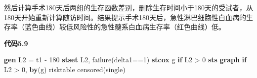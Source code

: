 \documentclass[
  chinese-hans,
  letterpaper,
  DIV=11,
  numbers=noendperiod]{scrreprt}
\newenvironment{Shaded}{\begin{snugshade}}{\end{snugshade}}
\newcommand{\KeywordTok}[1]{\textcolor[rgb]{0.00,0.23,0.31}{\textbf{#1}}}
\newcommand{\NormalTok}[1]{\textcolor[rgb]{0.00,0.23,0.31}{#1}}
\begin{document}
然后计算手术180天后两组的生存函数差别，删除生存时间小于180天的受试者，从180天开始重新计算随访时间。结果提示手术180天后，急性淋巴细胞性白血病的生存率（蓝色曲线）较低风险性的急性髓系白血病生存率（红色曲线）低。

\begin{tcolorbox}[enhanced jigsaw, arc=.35mm, bottomrule=.15mm, breakable, colback=white, colframe=quarto-callout-note-color-frame, left=2mm, leftrule=.75mm, opacityback=0, rightrule=.15mm, toprule=.15mm]

\vspace{-3mm}\textbf{代码5.9}\vspace{3mm}

\begin{Shaded}
\begin{Highlighting}[]
\KeywordTok{gen}\NormalTok{ L2 = t1 {-} 180}
\KeywordTok{stset}\NormalTok{ L2, failure(delta1==1)}
\KeywordTok{stcox}\NormalTok{ g }\KeywordTok{if}\NormalTok{ L2 \textgreater{} 0}
\KeywordTok{sts} \KeywordTok{graph} \KeywordTok{if}\NormalTok{ L2 \textgreater{} 0, }\KeywordTok{by}\NormalTok{(g) risktable censored(single)}
\end{Highlighting}
\end{Shaded}

\end{tcolorbox}
\end{document}
